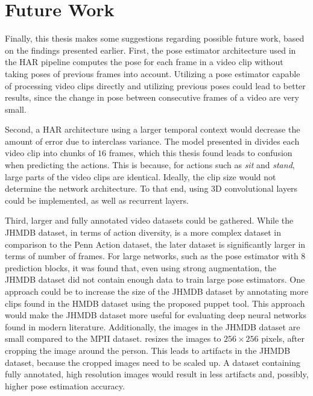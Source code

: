 \section{Future Work}
Finally, this thesis makes some suggestions regarding possible future work, based on the findings presented earlier. First, the pose estimator architecture used in the HAR pipeline computes the pose for each frame in a video clip without taking poses of previous frames into account.
Utilizing a pose estimator capable of processing video clips directly and utilizing previous poses could lead to better results, since the change in pose between consecutive frames of a video are very small.

Second, a HAR architecture using a larger temporal context would decrease the amount of error due to interclass variance.
The model presented in \cite{luvizon_2d/3d_2018} divides each video clip into chunks of $16$ frames, which this thesis found leads to confusion when predicting the actions.
This is because, for actions such as \textit{sit} and \textit{stand}, large parts of the video clips are identical.
Ideally, the clip size would not determine the network architecture.
To that end, using 3D convolutional layers could be implemented, as well as recurrent layers.

Third, larger and fully annotated video datasets could be gathered.
While the JHMDB dataset, in terms of action diversity, is a more complex dataset in comparison to the Penn Action dataset, the later dataset is significantly larger in terms of number of frames.
For large networks, such as the pose estimator with $8$ prediction blocks, it was found that, even using strong augmentation, the JHMDB dataset did not contain enough data to train large pose estimators.
One approach could be to increase the size of the JHMDB dataset by annotating more clips found in the HMDB dataset \cite{kuehne_hmdb:_2011} using the proposed puppet tool.
This approach would make the JHMDB dataset more useful for evaluating deep neural networks found in modern literature.
Additionally, the images in the JHMDB dataset are small compared to the MPII dataset.
\cite{luvizon_2d/3d_2018} resizes the images to $256 \times 256$ pixels, after cropping the image around the person.
This leads to artifacts in the JHMDB dataset, because the cropped images need to be scaled up.
A dataset containing fully annotated, high resolution images would result in less artifacts and, possibly, higher pose estimation accuracy.
